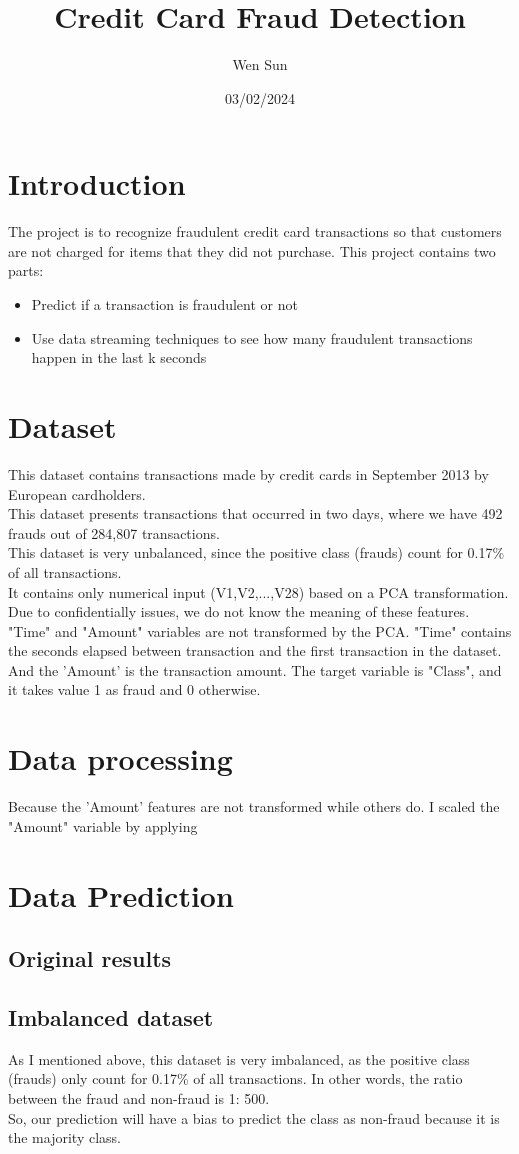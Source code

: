 \documentclass[12pt]{article}
\title{Credit Card Fraud Detection}
\author{Wen Sun}
\date{03/02/2024}
\begin{document}
\maketitle

\section{Introduction}
The project is to recognize fraudulent credit card transactions so that customers are not charged for items that they did not 
purchase. This project contains two parts: 

    \begin{itemize}
    \item Predict if a transaction is fraudulent or not
    \item Use data streaming techniques to see how many fraudulent transactions happen in the last k seconds
    \end{itemize}

\section{Dataset}
    This dataset contains transactions made by credit cards in September 2013 by European cardholders.\\
    This dataset presents transactions that occurred in two days, where we have 492 frauds out of 284,807 transactions.\\ 
    This dataset is very unbalanced, since the positive class (frauds) count for 0.17\% of all transactions.\\
    It contains only numerical input (V1,V2,...,V28) based on a PCA transformation. Due to confidentially issues, we do not know
    the meaning of these features. "Time" and "Amount" variables are not transformed by the PCA. "Time" contains the seconds elapsed
    between transaction and the first transaction in the dataset. And the 'Amount' is the transaction amount. The target variable is "Class", and
    it takes value 1 as fraud and 0 otherwise. 
\section{Data processing}
    Because the 'Amount' features are not transformed while others do. I scaled the "Amount" variable by applying 
\section{Data Prediction}
\subsection{Original results}

\subsection{Imbalanced dataset}
As I mentioned above, this dataset is very imbalanced, as the positive class (frauds) only count for 0.17\% of all transactions. In other words, the ratio between the fraud and non-fraud is 1: 500.\\
So, our prediction will have a bias to predict the class as non-fraud because it is the majority class. 
\end{document}
